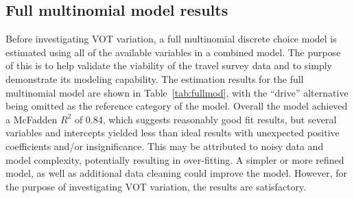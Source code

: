 \documentclass[numbered]{trbunofficial}\usepackage[]{graphicx}\usepackage[]{color}
\begin{document}
\subsection{Full multinomial model results}
Before investigating VOT variation, a full multinomial discrete choice model is estimated using all of the available variables in a combined model. The purpose of this is to help validate the viability of the travel survey data and to simply demonstrate its modeling capability. The estimation results for the full multinomial model are shown in Table~\ref{tab:fullmod}, with the ``drive'' alternative being omitted as the reference category of the model. Overall the model achieved a McFadden $R^2$ of 0.84, which suggests reasonably good fit results, but several variables and intercepts yielded less than ideal results with unexpected positive coefficients and/or insignificance. This may be attributed to noisy data and model complexity, potentially resulting in over-fitting. A simpler or more refined model, as well as additional data cleaning could improve the model. However, for the purpose of investigating VOT variation, the results are satisfactory.
\end{document}

